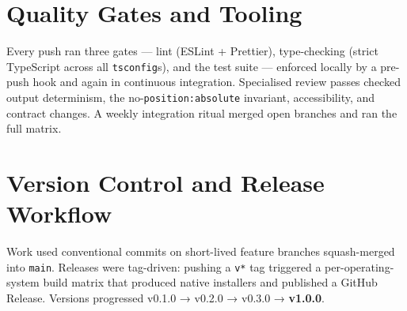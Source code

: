 \section{Quality Gates and Tooling}
Every push ran three gates --- lint (ESLint + Prettier), type-checking (strict
TypeScript across all \texttt{tsconfig}s), and the test suite --- enforced locally
by a pre-push hook and again in continuous integration. Specialised review passes
checked output determinism, the no-\texttt{position:absolute} invariant,
accessibility, and contract changes. A weekly integration ritual merged open
branches and ran the full matrix.

\section{Version Control and Release Workflow}
Work used conventional commits on short-lived feature branches squash-merged into
\texttt{main}. Releases were tag-driven: pushing a \texttt{v*} tag triggered a
per-operating-system build matrix that produced native installers and published a
GitHub Release. Versions progressed v0.1.0 → v0.2.0 → v0.3.0 → \textbf{v1.0.0}.
